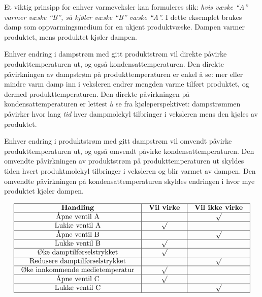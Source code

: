 
Et viktig prinsipp for enhver varmeveksler kan formuleres slik: {\it hvis væske ``A'' varmer væske ``B'', så kjøler væske ``B'' væske ``A''.}  I dette eksemplet brukes damp som oppvarmingsmedium for en ukjent produktvæske.  Dampen varmer produktet, mens produktet kjøler dampen.

\vskip 10pt

Enhver endring i dampstrøm med gitt produktstrøm vil direkte påvirke produkttemperaturen ut, og også kondensattemperaturen.  Den direkte påvirkningen av dampstrøm på produkttemperaturen er enkel å se: mer eller mindre varm damp inn i veksleren endrer mengden varme tilført produktet, og dermed produkttemperaturen.  Den direkte påvirkningen på kondensattemperaturen er lettest å se fra kjøleperspektivet: dampstrømmen påvirker hvor lang {\it tid} hver dampmolekyl tilbringer i veksleren mens den kjøles av produktet.

\vskip 10pt

Enhver endring i produktstrøm med gitt dampstrøm vil omvendt påvirke produkttemperaturen ut, og også omvendt påvirke kondensattemperaturen.  Den omvendte påvirkningen av produktstrøm på produkttemperaturen ut skyldes tiden hvert produktmolekyl tilbringer i veksleren og blir varmet av dampen.  Den omvendte påvirkningen på kondensattemperaturen skyldes endringen i hvor mye produktet kjøler dampen.



$$\vbox{\offinterlineskip
\halign{\strut
\vrule \quad\hfil # \ \hfil & 
\vrule \quad\hfil # \ \hfil & 
\vrule \quad\hfil # \ \hfil \vrule \cr
\noalign{\hrule}
%
{\bf Handling} & {\bf Vil virke} & {\bf Vil ikke virke} \cr
%
\noalign{\hrule}
%
Åpne ventil A &  & $\surd$ \cr
%
\noalign{\hrule}
%
Lukke ventil A & $\surd$  & \cr
%
\noalign{\hrule}
%
Åpne ventil B &  & $\surd$ \cr
%
\noalign{\hrule}
%
Lukke ventil B & $\surd$  & \cr
%
\noalign{\hrule}
%
Øke damptilførselstrykket & $\surd$  & \cr
%
\noalign{\hrule}
%
Redusere damptilførselstrykket &  & $\surd$ \cr
%
\noalign{\hrule}
%
Øke innkommende medietemperatur & $\surd$  & \cr
%
\noalign{\hrule}
%
Åpne ventil C & $\surd$  & \cr
%
\noalign{\hrule}
%
Lukke ventil C &  & $\surd$ \cr
%
\noalign{\hrule}
} %
}$$ %



